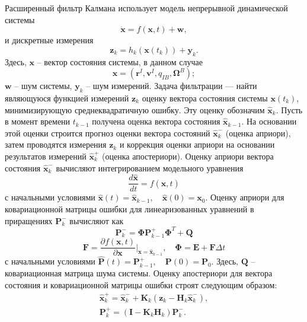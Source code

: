 Расширенный фильтр Калмана использует модель непрерывной динамической системы
\begin{equation} \label{eq:ekf_system}
\dot{\bm{x}} = f(\bm x, t) + \bm w,
\end{equation}
и дискретные измерения
\begin{equation} \label{eq:ekf_mes}
\bm z_k = h_k(\bm x(t_k)) + \bm y_k.
\end{equation}
Здесь, $\bm x$ -- вектор состояния системы, в данном случае
\begin{equation} \label{eq:ekf_state}
\bm x = (\bm r^I, \bm v^I, q_{IB},\bm \Omega^B);
\end{equation}
$\bm w$ -- шум системы, $\bm y_k$ -- шум измерений.
Задача фильтрации — найти являющуюся функцией измерений
$\bm z_k$
оценку вектора состояния системы
$\bm x(t_k)$,
минимизирующую среднеквадратичную ошибку.
Эту оценку обозначим $\hat{\bm{x}}_k$.
Пусть в момент времени $t_{k-1}$ получена оценка вектора состояния
$\hat{\bm{x}}_{k-1}$.
На основании этой оценки строится прогноз оценки вектора состояний
$\hat{\bm{x}}_k^-$
(оценка априори), затем проводятся измерения
$\bm z_k$
и коррекция оценки априори на основании результатов измерений
$\hat{\bm{x}}_k^+$
(оценка апостериори). Оценку априори вектора состояния
$\hat{\bm{x}}_k^-$ вычисляют интегрированием модельного уравнения
\begin{equation}
\frac{d\hat{\bm{x}}}{dt} = f(\hat{\bm{x}}, t)
\end{equation}
с начальными условиями
$\hat{\bm{x}}(t) = \hat{\bm{x}}_{k-1}, \quad \hat{\bm{x}}(0) = \bm x_0$.
Оценку априори для ковариационной матрицы ошибки для линеаризованных уравнений в приращениях
$\bm P_k^-$
вычисляют как
\begin{equation}
\bm P_k^- = \bm \Phi \bm P_{k-1}^+ \bm \Phi^{T} + \bm Q
\end{equation}
\begin{equation}
\bm F = \frac{\partial f(\bm x, t)}{\partial \bm x} \Bigg|_{\bm{x} = \hat{\bm{x}}_{k-1}}
, \quad
\bm \Phi = \bm E + \bm F \Delta t
\end{equation}
с начальными условиями
$\hat{\bm{P}}(t) = \bm{P}_{k-1}^+, \quad \bm{P}(0) = \bm P_0$.
Здесь, $\bm Q$ -- ковариационная матрица шума системы. Оценку апостериори для вектора состояния и ковариационной матрицы ошибки строят следующим образом:
\begin{equation}
\begin{array}{l}
{\bm{\hat x}}_k^ +  = {\bm{\hat x}}_k^ -  + {{\bm{K}}_k}({{\bm{z}}_k} - {{\bm{H}}_k}{\bm{\hat x}}_k^ - ),\\
{\bm{P}}_k^ +  = \left( {{\bm{I}} - {{\bm{K}}_k}{{\bm{H}}_k}} \right){\bm{P}}_k^ - .
\end{array}
\end{equation}

